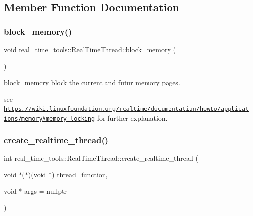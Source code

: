 \subsection{Member Function Documentation}
\mbox{\label{classreal__time__tools_1_1RealTimeThread_a704b245872cc7bc49e01181f09732535}} 
\subsubsection{\texorpdfstring{block\+\_\+memory()}{block\_memory()}}
{\footnotesize\ttfamily void real\+\_\+time\+\_\+tools\+::\+Real\+Time\+Thread\+::block\+\_\+memory (\begin{DoxyParamCaption}{ }\end{DoxyParamCaption})}



block\+\_\+memory block the current and futur memory pages. 

see \href{https://wiki.linuxfoundation.org/realtime/documentation/howto/applications/memory#memory-locking}{\tt https\+://wiki.\+linuxfoundation.\+org/realtime/documentation/howto/applications/memory\#memory-\/locking} for further explanation. \mbox{\label{classreal__time__tools_1_1RealTimeThread_a232e3955fee6e80c3a7ded68f165414b}} 
\subsubsection{\texorpdfstring{create\+\_\+realtime\+\_\+thread()}{create\_realtime\_thread()}}
{\footnotesize\ttfamily int real\+\_\+time\+\_\+tools\+::\+Real\+Time\+Thread\+::create\+\_\+realtime\+\_\+thread (\begin{DoxyParamCaption}\item[{void $\ast$($\ast$)(void $\ast$)}]{thread\+\_\+function,  }\item[{void $\ast$}]{args = {\ttfamily nullptr} }\end{DoxyParamCaption})}



